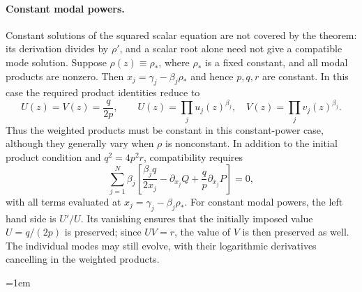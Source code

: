 \documentclass[11pt,a4paper]{article}
\numberwithin{equation}{section}
\begin{document}
\paragraph{Constant modal powers.}
Constant solutions of the squared scalar equation are not covered by the theorem: its derivation divides by $\rho'$, and a scalar root alone need not give a compatible mode solution.
Suppose $\rho(z)\equiv\rho_*$, where $\rho_*$ is a fixed constant, and all modal products are nonzero.
Then $x_j=\gamma_j-\beta_j\rho_*$ and hence $p,q,r$ are constant.
In this case the required product identities reduce to
\begin{equation}
    U(z)=V(z)=\frac{q}{2p},
    \qquad U(z)=\prod_j u_j(z)^{\beta_j},\quad
    V(z)=\prod_j v_j(z)^{\beta_j}.
\end{equation}
Thus the weighted products must be constant in this constant-power case, although they generally vary when $\rho$ is nonconstant.
In addition to the initial product condition and $q^2=4p^2r$, compatibility requires
\begin{equation}
    \sum_{j=1}^{N}\beta_j\left[
    \frac{\beta_j q}{2x_j}-\partial_{x_j}Q
    +\frac{q}{p}\partial_{x_j}P\right]=0,
    \label{eq:stationary-scalar-compatibility}
\end{equation}
with all terms evaluated at $x_j=\gamma_j-\beta_j\rho_*$.
For constant modal powers, the left hand side is $U'/U$. Its vanishing ensures that the initially imposed value $U=q/(2p)$ is preserved; since $UV=r$, the value of $V$ is then preserved as well.
The individual modes may still evolve, with their logarithmic derivatives cancelling in the weighted products.


\begingroup
\emergencystretch=1em
\printbibliography
\endgroup
\end{document}
